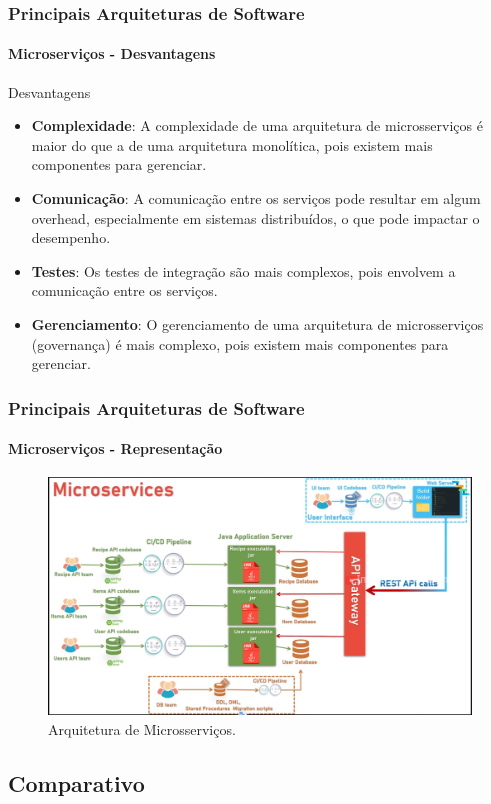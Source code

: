 \documentclass[
	10pt, %
	t, %
]{beamer}
\begin{document}
\begin{frame}
	\frametitle{Principais Arquiteturas de Software}
	\framesubtitle{Microserviços - Desvantagens}

	\begin{alertblock}{Desvantagens}
		\begin{itemize}
			\item \textbf{Complexidade}: A complexidade de uma arquitetura de microsserviços é maior do que a de uma arquitetura monolítica, pois existem mais componentes para gerenciar.
			\item \textbf{Comunicação}: A comunicação entre os serviços pode resultar em algum overhead, especialmente em sistemas distribuídos, o que pode impactar o desempenho.
			\item \textbf{Testes}: Os testes de integração são mais complexos, pois envolvem a comunicação entre os serviços.
			\item \textbf{Gerenciamento}: O gerenciamento de uma arquitetura de microsserviços (governança) é mais complexo, pois existem mais componentes para gerenciar.
		\end{itemize}
	\end{alertblock}

\end{frame}

\begin{frame}
	\frametitle{Principais Arquiteturas de Software}
	\framesubtitle{Microserviços - Representação}
	
	\begin{figure}
		\centering
		\includegraphics[width=0.9\linewidth]{Images/microservice.png}
		\caption{Arquitetura de Microsserviços.}\label{fig:microservices}
	\end{figure}

\end{frame}

\subsection{Comparativo}
\end{document}
